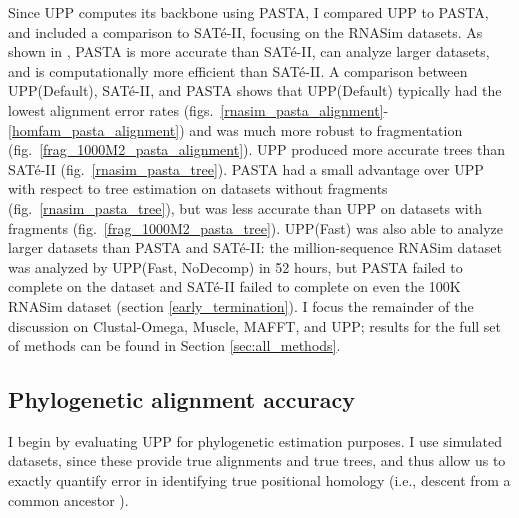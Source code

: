 Since UPP computes its backbone using PASTA,
I compared UPP to PASTA, and included
a comparison to SAT\'e-II, focusing on
the RNASim datasets. %
As shown in  \cite{PASTA},
PASTA is
more accurate than SAT\'e-II, can analyze larger datasets,
and is computationally more efficient than SAT\'e-II.
A comparison between UPP(Default), SAT\'e-II, and PASTA shows that 
UPP(Default) typically had the lowest
alignment error rates
(figs.~\ref{rnasim_pasta_alignment}-\ref{homfam_pasta_alignment})
and was much more robust to fragmentation
(fig.~\ref{frag_1000M2_pasta_alignment}). 
UPP produced more accurate trees than SAT\'e-II 
(fig.~\ref{rnasim_pasta_tree}).
PASTA had a small advantage over UPP with respect to tree estimation
on datasets without fragments
(fig.~\ref{rnasim_pasta_tree}), but was less accurate
than UPP on datasets with fragments
(fig.~\ref{frag_1000M2_pasta_tree}).
UPP(Fast) was  also able to analyze larger datasets 
than PASTA and SAT\'e-II:  the  million-sequence RNASim dataset
was analyzed by UPP(Fast, NoDecomp) in 52 hours, but
PASTA failed to complete on the dataset and SAT\'e-II failed to
complete on even the 100K RNASim dataset (section \ref{early_termination}).
I focus the remainder of the discussion on Clustal-Omega, Muscle, 
MAFFT, and UPP;
results for the full set of methods can be found in Section 
\ref{sec:all_methods}.  

\subsection{Phylogenetic alignment accuracy}
I begin by evaluating UPP for phylogenetic estimation purposes.
I use simulated datasets, since these provide
true alignments and true trees, and thus allow us
to exactly quantify error in identifying true positional homology
(i.e., descent from a common ancestor \cite{Reeck1987}).

